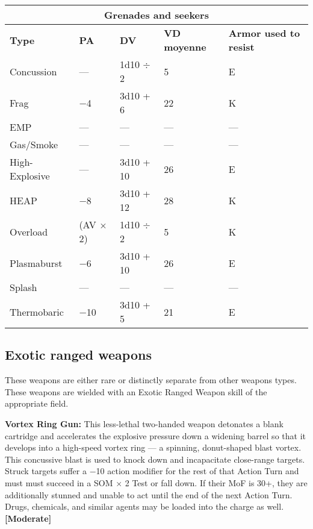 \begin{table} \begin{tabular}{|l|l|l|l|l|} \hline

\multicolumn{5}{|c|}{\textbf{Grenades and seekers}} \\ \hline

\textbf{Type}	&\textbf{PA}	&\textbf{DV}	&\textbf{VD moyenne}	&\textbf{Armor used to resist} \\ \hline

Concussion	&--- &1d10 $\div$ 2	&5	&E \\ \hline

Frag	&$-$4	&3d10 + 6	&22	&K \\ \hline

EMP	&--- &--- &--- &--- \\ \hline

Gas/Smoke	&--- &--- &--- &--- \\ \hline

High-Explosive	&--- &3d10 + 10	&26	&E \\ \hline

HEAP	&$-$8	&3d10 + 12	&28	&K \\ \hline

Overload	&(AV $\times$ 2)	&1d10 $\div$ 2	&5	&K \\ \hline

Plasmaburst	&$-$6	&3d10 + 10	&26	&E \\ \hline

Splash	&--- &--- &--- &--- \\ \hline

Thermobaric	&$-$10	&3d10 + 5	&21	&E \\ \hline

\end{tabular} \label{tab:grenades-seekers} \end{table} 

\subsection{Exotic ranged weapons} \label{sec:exotic-ranged-weapons} 

These weapons are either rare or distinctly separate from other weapons types. These weapons are wielded with an Exotic Ranged Weapon skill of the appropriate field. 

\textbf{Vortex Ring Gun:} This less-lethal two-handed weapon detonates a blank cartridge and accelerates the explosive pressure down a widening barrel so that it develops into a high-speed vortex ring --- a spinning, donut-shaped blast vortex. This concussive blast is used to knock down and incapacitate close-range targets. Struck targets suffer a $-$10 action modifier for the rest of that Action Turn and must must succeed in a SOM $\times$ 2 Test or fall down. If their MoF is 30+, they are additionally stunned and unable to act until the end of the next Action Turn. Drugs, chemicals, and similar agents may be loaded into the charge as well. \textbf{[Moderate]} 


